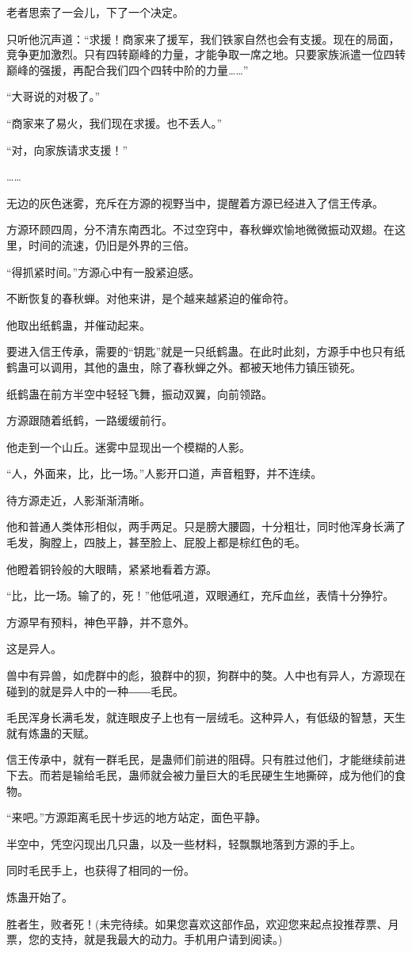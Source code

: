 \begin{this_body}
老者思索了一会儿，下了一个决定。

只听他沉声道：“求援！商家来了援军，我们铁家自然也会有支援。现在的局面，竞争更加激烈。只有四转巅峰的力量，才能争取一席之地。只要家族派遣一位四转巅峰的强援，再配合我们四个四转中阶的力量……”

“大哥说的对极了。”

“商家来了易火，我们现在求援。也不丢人。”

“对，向家族请求支援！”

……

无边的灰色迷雾，充斥在方源的视野当中，提醒着方源已经进入了信王传承。

方源环顾四周，分不清东南西北。不过空窍中，春秋蝉欢愉地微微振动双翅。在这里，时间的流速，仍旧是外界的三倍。

“得抓紧时间。”方源心中有一股紧迫感。

不断恢复的春秋蝉。对他来讲，是个越来越紧迫的催命符。

他取出纸鹤蛊，并催动起来。

要进入信王传承，需要的“钥匙”就是一只纸鹤蛊。在此时此刻，方源手中也只有纸鹤蛊可以调用，其他的蛊虫，除了春秋蝉之外。都被天地伟力镇压锁死。

纸鹤蛊在前方半空中轻轻飞舞，振动双翼，向前领路。

方源跟随着纸鹤，一路缓缓前行。

他走到一个山丘。迷雾中显现出一个模糊的人影。

“人，外面来，比，比一场。”人影开口道，声音粗野，并不连续。

待方源走近，人影渐渐清晰。

他和普通人类体形相似，两手两足。只是膀大腰圆，十分粗壮，同时他浑身长满了毛发，胸膛上，四肢上，甚至脸上、屁股上都是棕红色的毛。

他瞪着铜铃般的大眼睛，紧紧地看着方源。

“比，比一场。输了的，死！”他低吼道，双眼通红，充斥血丝，表情十分狰狞。

方源早有预料，神色平静，并不意外。

这是异人。

兽中有异兽，如虎群中的彪，狼群中的狈，狗群中的獒。人中也有异人，方源现在碰到的就是异人中的一种――毛民。

毛民浑身长满毛发，就连眼皮子上也有一层绒毛。这种异人，有低级的智慧，天生就有炼蛊的天赋。

信王传承中，就有一群毛民，是蛊师们前进的阻碍。只有胜过他们，才能继续前进下去。而若是输给毛民，蛊师就会被力量巨大的毛民硬生生地撕碎，成为他们的食物。

“来吧。”方源距离毛民十步远的地方站定，面色平静。

半空中，凭空闪现出几只蛊，以及一些材料，轻飘飘地落到方源的手上。

同时毛民手上，也获得了相同的一份。

炼蛊开始了。

胜者生，败者死！(未完待续。如果您喜欢这部作品，欢迎您来起点投推荐票、月票，您的支持，就是我最大的动力。手机用户请到阅读。)

\end{this_body}

